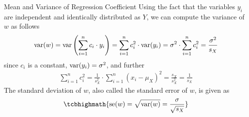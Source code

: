 %
\begin{frame}{Mean and Variance of Regression Coefficient}
Using the fact that the variables $y_i$ are independent and identically
distributed as $Y$,
we can compute the variance of $w$ as follows
\begin{align*}
    \operatorname{var}(w) = \operatorname{var}\left( \sum^{n}_{i=1} c_i \cdot y_i\right) = \sum^{n}_{i=1}
    c_i^2 \cdot \operatorname{var}(y_i) = 
    \sigma^2 \cdot \sum^{n}_{i=1} c_i^2 = 
    \frac{\sigma^2}{s_X}
\end{align*}
since $c_i$ is a constant, $\operatorname{var}(y_i) = \sigma^2$, and further
\begin{align*}
\sum_{i=1}^n c_i^2 = \frac{1}{ s_X^2}  \cdot \sum^{n}_{i=1}  (x_i - \mu_X)^2
    = \frac{s_X}{s_X^2} = \frac{1}{s_X}
\end{align*}
The standard deviation of $w$, also called the standard error of
$w$, is given as
\begin{align*}
    \tcbhighmath{
    \se(w) = \sqrt{\var(w)} = \frac{\sigma}{\sqrt{s_X}}}
\end{align*}
\end{frame}

